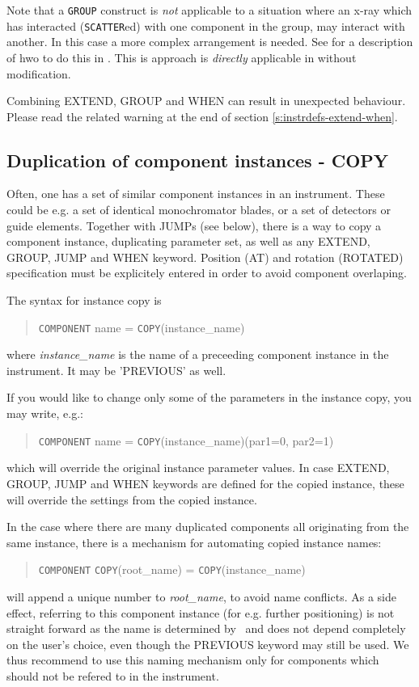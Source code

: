Note that a \texttt{GROUP} construct is \emph{not} applicable to a situation where an x-ray which has interacted (\texttt{SCATTER}ed) with one component in the group, may interact with another. In this case a more complex arrangement is needed. See \cite{willendrup2011using} for a description of hwo to do this in \MCS. This is approach is \emph{directly} applicable in \MCX without modification. 

Combining EXTEND, GROUP and WHEN can result in unexpected behaviour. Please read the related warning at the end of section \ref{s:instrdefs-extend-when}.

\subsection{Duplication of component instances - COPY}
\label{s:instrdefs-extend-copy}

Often, one has a set of similar component instances in an instrument. These could be e.g. a set of identical monochromator blades, or a set of detectors or guide elements.
Together with JUMPs (see below), there is a way to copy a component instance, duplicating parameter set, as well as any EXTEND, GROUP, JUMP and WHEN keyword.
Position (AT) and rotation (ROTATED) specification must be explicitely entered in order to avoid component overlaping.

The syntax for instance copy is
\begin{quote}
  \texttt{COMPONENT} name = \texttt{COPY}(instance\_name)
\end{quote}
where \textit{instance\_name} is the name of a preceeding component instance in the instrument. It may be 'PREVIOUS' as well.

If you would like to change only some of the parameters in the instance copy, you may write, e.g.:
\begin{quote}
  \texttt{COMPONENT} name = \texttt{COPY}(instance\_name)(par1=0, par2=1)
\end{quote}
which will override the original instance parameter values. In case EXTEND, GROUP, JUMP and WHEN
keywords are defined for the copied instance, these will override the settings
from the copied instance.

In the case where there are many duplicated components all originating from the same instance, there is a mechanism for automating copied instance names:
\begin{quote}
  \texttt{COMPONENT} \texttt{COPY}(root\_name) = \texttt{COPY}(instance\_name)
\end{quote}
will append a unique number to \textit{root\_name}, to avoid name
conflicts. As a side effect, referring to this component instance (for
e.g. further positioning) is not straight forward as the name is
determined by \MCX\ and does not depend completely on the user's
choice, even though the PREVIOUS keyword may still be used. We thus recommend to use this naming mechanism only for components which should not be refered to in the instrument.

